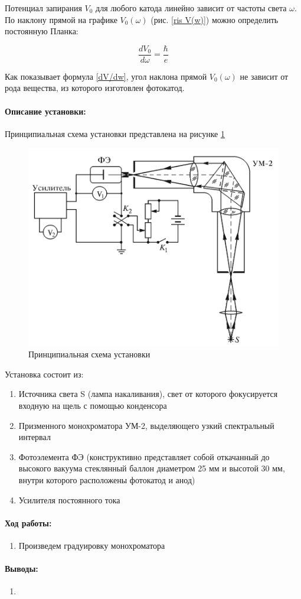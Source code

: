 \documentclass[a4paper,12pt]{article}
\begin{document}
	Потенциал запирания $ V_0 $ для любого катода линейно зависит от
	частоты света $ \omega $. По наклону прямой на графике $ V_0(\omega) $ (рис. \ref{ris V(w)}) можно определить постоянную Планка:
	
	\begin{equation}\label{dV/dw}
	\dfrac{dV_0}{d\omega} = \dfrac{\hbar}{e}
	\end{equation}
	
	Как показывает формула \eqref{dV/dw}, угол наклона прямой $ V_0(\omega) $ не зависит от рода вещества, из которого изготовлен фотокатод. 
\paragraph{Описание установки:}
Принципиальная схема установки представлена на рисунке {\ref{setup}}
\begin{figure}[h!]
\centering
\includegraphics[scale=0.4]{setup.png}
\caption{Принципиальная схема установки}
\label{setup} 
\end{figure}
Установка состоит из:
\begin{enumerate}
\itemsep0em
\item Источника света S (лампа накаливания), свет от которого фокусируется входную на щель с помощью конденсора 
\item Призменного монохроматора УМ-2, выделяющего узкий спектральный интервал
\item Фотоэлемента ФЭ (конструктивно представляет собой откачанный до высокого вакуума стеклянный баллон диаметром 25 мм и высотой 30 мм, внутри которого расположены фотокатод и анод)
\item Усилителя постоянного тока  
\end{enumerate}
\paragraph{Ход работы:}
\begin{enumerate}
\itemsep0em
\item Произведем градуировку монохроматора
\end{enumerate}
\paragraph{Выводы:}
\begin{enumerate}
\item
\end{enumerate}
\end{document}
